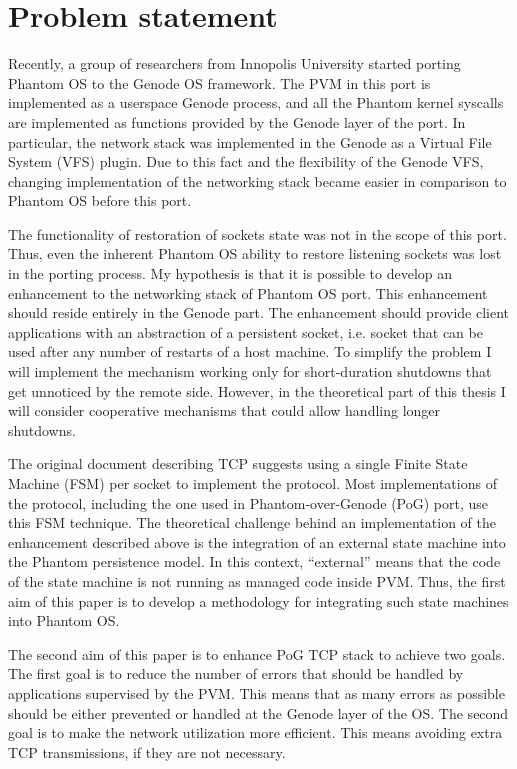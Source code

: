 \section{Problem statement}

Recently, a group of researchers from Innopolis University started porting
Phantom OS to the Genode OS framework. The PVM in this port is implemented as a
userspace Genode process, and all the Phantom kernel syscalls are implemented
as functions provided by the Genode layer of the port. In particular, the
network stack was implemented in the Genode as a Virtual File System (VFS)
plugin. Due to this fact and the flexibility of the Genode VFS, changing
implementation of the networking stack became easier in comparison to Phantom
OS before this port. 

The functionality of restoration of sockets state was not in the scope of this
port. Thus, even the inherent Phantom OS ability to restore listening sockets
was lost in the porting process. My hypothesis is that it is possible to
develop an enhancement to the networking stack of Phantom OS port. This
enhancement should reside entirely in the Genode part. The enhancement should
provide client applications with an abstraction of a persistent socket, i.e.
socket that can be used after any number of restarts of a host machine. To
simplify the problem I will implement the mechanism working only for
short-duration shutdowns that get unnoticed by the remote side. However, in
the theoretical part of this thesis I will consider cooperative mechanisms
that could allow handling longer shutdowns.

The original document describing TCP \cite{john1981transmission} suggests using
a single Finite State Machine (FSM) per socket to implement the protocol. Most
implementations of the protocol, including the one used in Phantom-over-Genode
(PoG) port, use this FSM technique. The theoretical challenge behind an
implementation of the enhancement described above is the integration of an
external state machine into the Phantom persistence model. In this context,
“external” means that the code of the state machine is not running as managed
code inside PVM. Thus, the first aim of this paper is to develop a methodology
for integrating such state machines into Phantom OS. 

The second aim of this paper is to enhance PoG TCP stack to achieve two goals.
The first goal is to reduce the number of errors that should be handled by
applications supervised by the PVM. This means that as many errors as possible
should be either prevented or handled at the Genode layer of the OS. The second
goal is to make the network utilization more efficient. This means avoiding
extra TCP transmissions, if they are not necessary.

